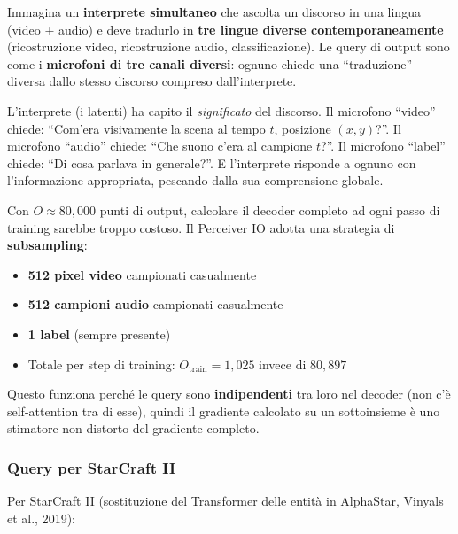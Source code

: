 \documentclass[12pt,a4paper]{article}
\begin{document}
\begin{notabox}
Immagina un \textbf{interprete simultaneo} che ascolta un discorso in una lingua (video + audio) e deve tradurlo in \textbf{tre lingue diverse contemporaneamente} (ricostruzione video, ricostruzione audio, classificazione). Le query di output sono come i \textbf{microfoni di tre canali diversi}: ognuno chiede una ``traduzione'' diversa dallo stesso discorso compreso dall'interprete.

L'interprete (i latenti) ha capito il \emph{significato} del discorso. Il microfono ``video'' chiede: ``Com'era visivamente la scena al tempo $t$, posizione $(x, y)$?''. Il microfono ``audio'' chiede: ``Che suono c'era al campione $t$?''. Il microfono ``label'' chiede: ``Di cosa parlava in generale?''. E l'interprete risponde a ognuno con l'informazione appropriata, pescando dalla sua comprensione globale.
\end{notabox}

\begin{notabox}
Con $O \approx 80{,}000$ punti di output, calcolare il decoder completo ad ogni passo di training sarebbe troppo costoso. Il Perceiver IO adotta una strategia di \textbf{subsampling}:
\begin{itemize}
    \item \textbf{512 pixel video} campionati casualmente
    \item \textbf{512 campioni audio} campionati casualmente
    \item \textbf{1 label} (sempre presente)
    \item Totale per step di training: $O_{\text{train}} = 1{,}025$ invece di $80{,}897$
\end{itemize}
Questo funziona perch\'e le query sono \textbf{indipendenti} tra loro nel decoder (non c'\`e self-attention tra di esse), quindi il gradiente calcolato su un sottoinsieme \`e uno stimatore non distorto del gradiente completo.
\end{notabox}

\subsubsection{Query per StarCraft II}

Per StarCraft II (sostituzione del Transformer delle entit\`a in AlphaStar, Vinyals et al., 2019):
\end{document}
